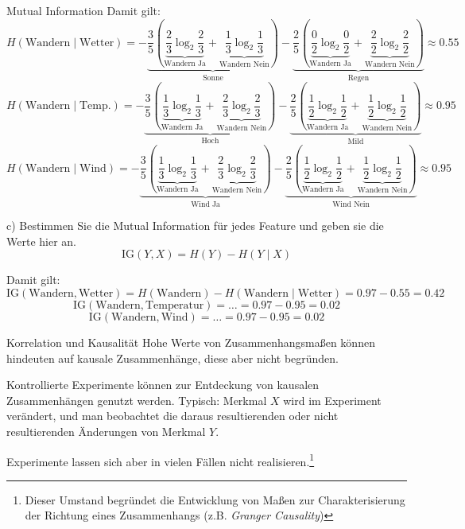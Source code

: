 \begin{example}{Mutual Information}
    Damit gilt:
    \[
        H(\text{Wandern} \mid \text{Wetter})
        = - \underbrace{\frac{3}{5} \left( \underbrace{\frac{2}{3} \log_2 \frac{2}{3}}_{\text{Wandern Ja}} + \underbrace{\frac{1}{3} \log_2 \frac{1}{3}}_{\text{Wandern Nein}} \right)}_{\text{Sonne}}
        - \underbrace{\frac{2}{5} \left( \underbrace{\frac{0}{2} \log_2 \frac{0}{2}}_{\text{Wandern Ja}} + \underbrace{\frac{2}{2} \log_2 \frac{2}{2}}_{\text{Wandern Nein}} \right)}_{\text{Regen}}
        \approx 0.55
    \]
    \[
        H(\text{Wandern} \mid \text{Temp.})
        = - \underbrace{\frac{3}{5} \left( \underbrace{\frac{1}{3} \log_2 \frac{1}{3}}_{\text{Wandern Ja}} + \underbrace{\frac{2}{3} \log_2 \frac{2}{3}}_{\text{Wandern Nein}} \right)}_{\text{Hoch}}
        - \underbrace{\frac{2}{5} \left( \underbrace{\frac{1}{2} \log_2 \frac{1}{2}}_{\text{Wandern Ja}} + \underbrace{\frac{1}{2} \log_2 \frac{1}{2}}_{\text{Wandern Nein}} \right)}_{\text{Mild}}
        \approx 0.95
    \]
    \[
        H(\text{Wandern} \mid \text{Wind})
        = - \underbrace{\frac{3}{5} \left( \underbrace{\frac{1}{3} \log_2 \frac{1}{3}}_{\text{Wandern Ja}} + \underbrace{\frac{2}{3} \log_2 \frac{2}{3}}_{\text{Wandern Nein}} \right)}_{\text{Wind Ja}}
        - \underbrace{\frac{2}{5} \left( \underbrace{\frac{1}{2} \log_2 \frac{1}{2}}_{\text{Wandern Ja}} + \underbrace{\frac{1}{2} \log_2 \frac{1}{2}}_{\text{Wandern Nein}} \right)}_{\text{Wind Nein}}
        \approx 0.95
    \]

    c) Bestimmen Sie die Mutual Information für jedes Feature und geben sie die Werte hier an.
    \[
        \text{IG}(Y, X) = H(Y) - H(Y \mid X)
    \]

    Damit gilt:
    \[
        \text{IG}(\text{Wandern}, \text{Wetter}) = H(\text{Wandern}) - H(\text{Wandern} \mid \text{Wetter})
        = 0.97 - 0.55 = 0.42
    \]
    \[
        \text{IG}(\text{Wandern}, \text{Temperatur}) = \ldots
        = 0.97 - 0.95 = 0.02
    \]
    \[
        \text{IG}(\text{Wandern}, \text{Wind}) = \ldots
        = 0.97 - 0.95 = 0.02
    \]
\end{example}

\begin{bonus}{Korrelation und Kausalität}
    Hohe Werte von Zusammenhangsmaßen können hindeuten auf kausale Zusammenhänge, diese aber nicht begründen.

    Kontrollierte Experimente können zur Entdeckung von kausalen Zusammenhängen genutzt werden.
    Typisch: Merkmal $X$ wird im Experiment verändert, und man beobachtet die daraus resultierenden oder nicht resultierenden Änderungen von Merkmal $Y$.

    Experimente lassen sich aber in vielen Fällen nicht realisieren.\footnote{Dieser Umstand begründet die Entwicklung von Maßen zur Charakterisierung der Richtung eines Zusammenhangs (z.B. \emph{Granger Causality})}
\end{bonus}

